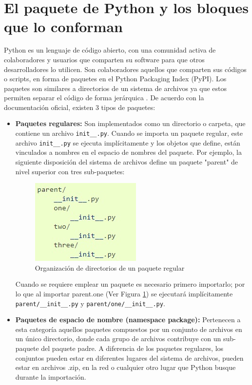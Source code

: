 \section{El paquete de Python y los bloques que lo conforman}
Python es un lenguaje de código abierto, con una comunidad activa de colaboradores y usuarios que comparten su software para que otros desarrolladores lo utilicen. Son colaboradores aquellos que comparten sus códigos o scripts, en forma de paquetes en el Python Packaging Index (PyPI). Los paquetes son similares a directorios de un sistema de archivos ya que estos permiten separar el código de forma jerárquica \cite{Paquetes}. De acuerdo con la documentación oficial, existen 3 tipos de paquetes:
\begin{itemize}
    \item \textbf{Paquetes regulares:} Son implementados como un directorio o carpeta, que contiene un archivo \texttt{init__.py}. Cuando se importa un paquete regular, este archivo \texttt{init__.py} se ejecuta implícitamente y los objetos que define, están vinculados a nombres en el espacio de nombres del paquete. Por ejemplo, la siguiente disposición del sistema de archivos define un paquete "parent" de nivel superior con tres sub-paquetes:
\begin{figure}[H]
    \centering
    \includegraphics[scale = 0.8]{Recursos/paqueteRegular.jpg}
    \caption{Organización de directorios de un paquete regular}
    \label{PaqueteRegular}
\end{figure}
Cuando se requiere emplear un paquete es necesario primero importarlo; por lo que al importar parent.one (Ver Figura \ref{PaqueteRegular}) se ejecutará implícitamente \texttt{parent/__init__.py} y \texttt{parent/one/__init__.py}. 
\item \textbf{Paquetes de espacio de nombre (namespace package):} Pertenecen a esta categoría aquellos paquetes compuestos por un conjunto de archivos en un único directorio, donde cada grupo de archivos contribuye con un sub-paquete del paquete padre. A diferencia de los paquetes regulares, los conjuntos pueden estar en diferentes lugares del sistema de archivos, pueden estar en archivos .zip, en la red o cualquier otro lugar que Python busque durante la importación.

\end{itemize}
